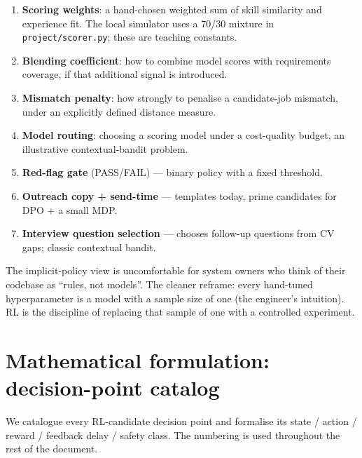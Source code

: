 \documentclass[11pt,oneside]{scrbook}
\begin{document}
\begin{enumerate}
  \item \textbf{Scoring weights}: a hand-chosen weighted sum of skill
        similarity and experience fit. The local simulator uses a 70/30
        mixture in \texttt{project/scorer.py}; these are teaching constants.
  \item \textbf{Blending coefficient}: how to combine model scores with
        requirements coverage, if that additional signal is introduced.
  \item \textbf{Mismatch penalty}: how strongly to penalise a candidate-job
        mismatch, under an explicitly defined distance measure.
  \item \textbf{Model routing}: choosing a scoring model under a
        cost-quality budget, an illustrative contextual-bandit problem.
  \item \textbf{Red-flag gate} (PASS/FAIL) ---
        binary policy with a fixed threshold.
  \item \textbf{Outreach copy + send-time} --- templates today, prime
        candidates for DPO + a small MDP.
  \item \textbf{Interview question selection} --- chooses follow-up questions
        from CV gaps; classic contextual bandit.
\end{enumerate}

\begin{pitfall}
The implicit-policy view is uncomfortable for system owners who think of
their codebase as ``rules, not models''. The cleaner reframe: every
hand-tuned hyperparameter is a model with a sample size of one (the
engineer's intuition). RL is the discipline of replacing that sample of
one with a controlled experiment.
\end{pitfall}

\chapter{Mathematical formulation: decision-point catalog}

We catalogue every RL-candidate decision point and formalise its state /
action / reward / feedback delay / safety class. The numbering is used
throughout the rest of the document.
\end{document}
